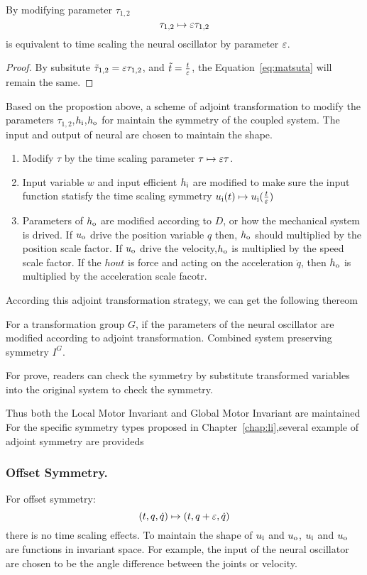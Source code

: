 \begin{myprop}
By modifying parameter $\tau_{1,2}$
\[
\tau_{1,2} \mapsto \varepsilon \tau_{1,2}
\]
is equivalent to time scaling the neural oscillator by parameter $\varepsilon$.
\end{myprop}
\begin{proof}
By subsitute $\tilde{\tau}_{1,2}=\varepsilon \tau_{1,2}$, and $\tilde{t}=\frac{t}{\varepsilon}$, the Equation~\ref{eq:matsuta} will remain the same.
\end{proof}

Based on the propostion above, a scheme of adjoint transformation to modify the parameters $\tau_{1,2}$,$h_{\mathrm{i}}$,$h_{\mathrm{o}}$ for maintain the symmetry of the  coupled system.
The input and output of neural are chosen to maintain the shape.
\begin{enumerate}
\item Modify $\tau$ by the time scaling parameter $\tau \mapsto \varepsilon \tau$.
\item Input variable $w$ and input efficient $h_{\mathrm{i}}$ are modified to make sure the input function statisfy the time scaling symmetry $u_{\mathrm{i}}(t) \mapsto u_{\mathrm{i}}(\frac{t}{\varepsilon})$
\item  Parameters of $h_{\mathrm{o}}$ are modified according to $D$, or how the mechanical system is drived.
If $u_{\mathrm{o}}$ drive the position variable $q$ then, $h_{\mathrm{o}}$ should multiplied by the position scale factor. 
If $u_{\mathrm{o}}$ drive the velocity,$h_{\mathrm{o}}$ is multiplied by the speed scale factor.
If the $hout$ is force and acting on the acceleration $\ddot{q}$, then $h_{\mathrm{o}}$ is multiplied by the acceleration scale facotr.
\end{enumerate}


According this adjoint transformation strategy, we can get the following thereom
\begin{mythe}
For a transformation group $G$, if the parameters of the neural oscillator are modified according to adjoint transformation.
 Combined system preserving symmetry $I^G$.
\end{mythe}
For prove, readers can check the symmetry by substitute transformed variables into the original system to check the symmetry.

Thus both the Local Motor Invariant and Global Motor Invariant are maintained
For the specific symmetry types proposed in Chapter~\ref{chap:li},several example of adjoint symmetry are provideds


\subsubsection*{ Offset Symmetry.}
For offset symmetry:
\[
(t,q,\dot{q}) \mapsto (t,q+\varepsilon,\dot{q})
\]
there is no time scaling effects.
To maintain the shape of $u_{\mathrm{i}}$ and $u_{\mathrm{o}}$,  $u_{\mathrm{i}}$ and $u_{\mathrm{o}}$ are functions in invariant space.
For example, the input of the neural oscillator are chosen to be the angle difference between the joints or velocity.



